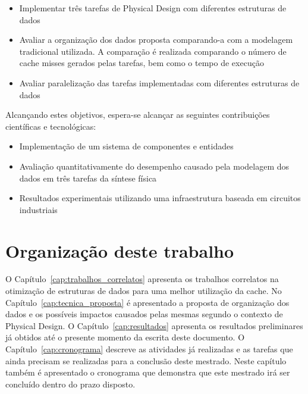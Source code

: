     \begin{itemize}
        \item Implementar três tarefas de Physical Design com diferentes estruturas de dados
        \item Avaliar a organização dos dados proposta comparando-a com a modelagem tradicional utilizada. A comparação é realizada comparando o número de cache misses gerados pelas tarefas, bem como o tempo de execução
        \item Avaliar paralelização das tarefas implementadas com diferentes estruturas de dados
    \end{itemize}

    Alcançando estes objetivos, espera-se alcançar as seguintes contribuições científicas e tecnológicas:

    \begin{itemize}
        \item Implementação de um sistema de componentes e entidades
        \item Avaliação quantitativamente do desempenho causado pela modelagem dos dados em três tarefas da síntese física
        \item Resultados experimentais utilizando uma infraestrutura baseada em circuitos industriais
    \end{itemize}


%

\section{Organização deste trabalho}

O Capítulo~\ref{cap:trabalhos_correlatos} apresenta os trabalhos correlatos na otimização de estruturas de dados para uma melhor utilização da cache.
No Capítulo~\ref{cap:tecnica_proposta} é apresentado a proposta de organização dos dados e os possíveis impactos causados pelas mesmas segundo o contexto de Physical Design.
O Capítulo~\ref{cap:resultados} apresenta os resultados preliminares já obtidos até o presente momento da escrita deste documento.
O Capítulo~\ref{cap:cronograma} descreve as atividades já realizadas e as tarefas que ainda precisam se realizadas para a conclusão deste mestrado. Neste capítulo também é apresentado o cronograma que demonstra que este mestrado irá ser concluído dentro do prazo disposto.
